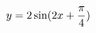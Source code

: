 \documentclass[preview]{standalone}
\begin{document}
\begin{align*}
\special{dvisvgm:raw <g id='unique000'>}y=2\sin(2x+\frac{\pi}{4})\special{dvisvgm:raw </g>}
\end{align*}
\end{document}
